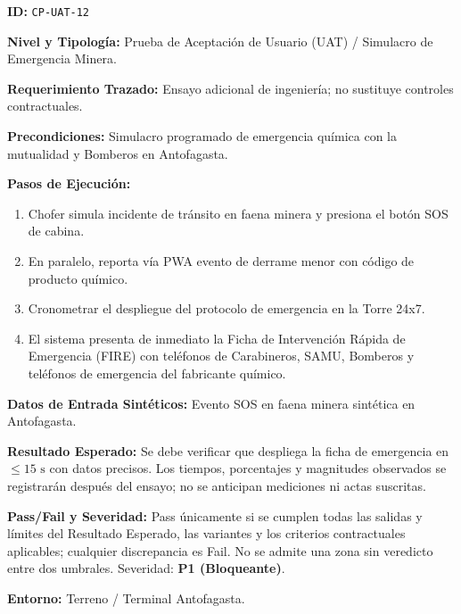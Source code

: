 \par\noindent\textbf{ID:} \texttt{C\allowbreak{}P\allowbreak{}-\allowbreak{}U\allowbreak{}A\allowbreak{}T\allowbreak{}-\allowbreak{}1\allowbreak{}2\allowbreak{}}\par
\par\noindent\textbf{Nivel y Tipología:} Prueba de Aceptación de Usuario (UAT) / Simulacro de Emergencia Minera.\par
\par\noindent\textbf{Requerimiento Trazado:} Ensayo adicional de ingeniería; no sustituye controles contractuales.\par
\par\noindent\textbf{Precondiciones:} Simulacro programado de emergencia química con la mutualidad y Bomberos en Antofagasta.\par
\par\noindent\textbf{Pasos de Ejecución:} \par
\begin{enumerate}
\item Chofer simula incidente de tránsito en faena minera y presiona el botón SOS de cabina.
\item En paralelo, reporta vía PWA evento de derrame menor con código de producto químico.
\item Cronometrar el despliegue del protocolo de emergencia en la Torre 24x7.
\item El sistema presenta de inmediato la Ficha de Intervención Rápida de Emergencia (FIRE) con teléfonos de Carabineros, SAMU, Bomberos y teléfonos de emergencia del fabricante químico.
\end{enumerate}
\par\noindent\textbf{Datos de Entrada Sintéticos:} Evento SOS en faena minera sintética en Antofagasta.\par
\par\noindent\textbf{Resultado Esperado:} Se debe verificar que despliega la ficha de emergencia en \(\le 15\text{ s}\) con datos precisos. Los tiempos, porcentajes y magnitudes observados se registrarán después del ensayo; no se anticipan mediciones ni actas suscritas.\par
\par\noindent\textbf{Pass/Fail y Severidad:} Pass únicamente si se cumplen todas las salidas y límites del Resultado Esperado, las variantes y los criterios contractuales aplicables; cualquier discrepancia es Fail. No se admite una zona sin veredicto entre dos umbrales. Severidad: \textbf{P1 (Bloqueante)}.\par
\par\noindent\textbf{Entorno:} Terreno / Terminal Antofagasta.\par







